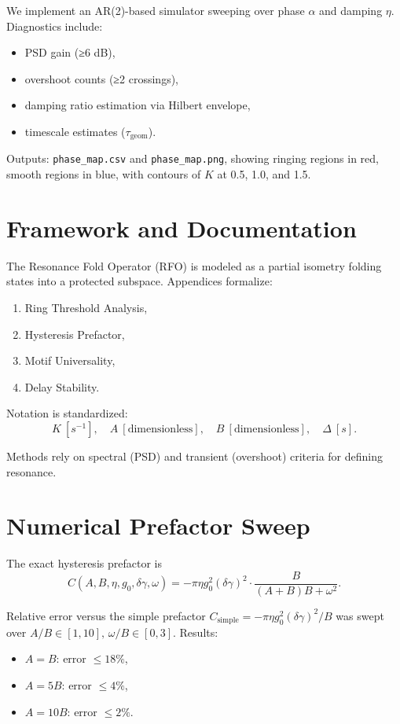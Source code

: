 \documentclass[12pt]{article}
\begin{document}
We implement an AR(2)-based simulator sweeping over phase $\alpha$ and damping $\eta$.
Diagnostics include:
\begin{itemize}
  \item PSD gain (≥6 dB),
  \item overshoot counts (≥2 crossings),
  \item damping ratio estimation via Hilbert envelope,
  \item timescale estimates ($\tau_{\text{geom}}$).
\end{itemize}
Outputs: \texttt{phase\_map.csv} and \texttt{phase\_map.png}, showing ringing regions
in red, smooth regions in blue, with contours of $K$ at 0.5, 1.0, and 1.5.

\section{Framework and Documentation}

The Resonance Fold Operator (RFO) is modeled as a partial isometry folding states into
a protected subspace. Appendices formalize:
\begin{enumerate}
  \item Ring Threshold Analysis,
  \item Hysteresis Prefactor,
  \item Motif Universality,
  \item Delay Stability.
\end{enumerate}

Notation is standardized:
\[
K \ [s^{-1}], \quad A \ [\text{dimensionless}], \quad B \ [\text{dimensionless}], \quad \Delta \ [s].
\]

Methods rely on spectral (PSD) and transient (overshoot) criteria for defining resonance.

\section{Numerical Prefactor Sweep}

The exact hysteresis prefactor is
\[
C(A,B,\eta,g_0,\delta\gamma,\omega) =
-\pi \eta g_0^2 (\delta\gamma)^2 \cdot \frac{B}{(A+B)B + \omega^2}.
\]

Relative error versus the simple prefactor $C_{\text{simple}} = -\pi \eta g_0^2 (\delta\gamma)^2/B$ was swept over $A/B \in [1,10], \, \omega/B \in [0,3]$.
Results:
\begin{itemize}
  \item $A=B$: error $\le 18\%$,
  \item $A=5B$: error $\le 4\%$,
  \item $A=10B$: error $\le 2\%$.
\end{itemize}
\end{document}
